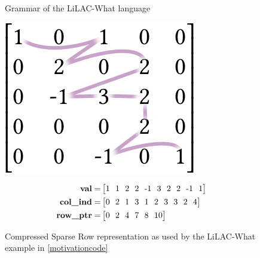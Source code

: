 \begin{figure}[p]

\vspace{-1.5em}
\caption{Grammar of the LiLAC-What language}
\label{bnfgrammar}
\vspace{1.5em}
\begin{minipage}[b]{0.3\linewidth}
\includegraphics[width=0.9\linewidth]{figures/csrorder.png}
\vspace{0.04em}
\end{minipage}
\begin{minipage}[b]{0.65\linewidth}
\begin{align*}
\text{\bf val} =& \begin{bmatrix}
1\ \ 1\ \ 2\ \ 2\ \ \text{-}1\ \ 3\ \ 2\ \ 2\ \ \text{-}1\ \ 1\\
\end{bmatrix}\\
\text{\bf col\_ind} =& \begin{bmatrix}
0\ \ 2\ \ 1\ \ 3\ \ 1\ \ 2\ \ 3\ \ 3\ \ 2\ \ 4\\
\end{bmatrix}\\
\text{\bf row\_ptr} =& \begin{bmatrix}
0\ \ 2\ \ 4\ \ 7\ \ 8\ \ 10\\
\end{bmatrix}
\end{align*}
\end{minipage}
\caption{Compressed Sparse Row representation as used by the LiLAC-What example
         in \autoref{motivationcode}}
\label{csr_lilacwhat_fig}
\vspace{1.5em}
\centering
\begin{minipage}[b]{0.3\linewidth}

\end{minipage}
\end{figure}
